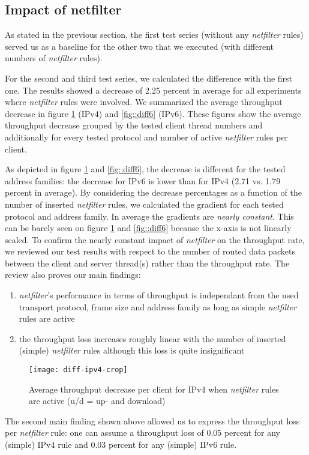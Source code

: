 \documentclass{sig-alternate}
\begin{document}
\subsection{Impact of netfilter}
\noindent As stated in the previous section, the first test series (without any 
\emph{netfilter} rules) served us as a baseline for the other two that we 
executed (with different numbers of \emph{netfilter} rules).

\newpage
\noindent For the second and third test series, we calculated the difference 
with the first one. The results showed a decrease of 2.25 percent in average for 
all experiments where \emph{netfilter} rules were involved. We summarized the
average throughput decrease in figure \ref{fig::diff4} (IPv4) and 
\ref{fig::diff6} (IPv6). These figures show the average throughput decrease 
grouped by the tested client thread numbers and additionally for every tested 
protocol and number of active \emph{netfilter} rules per client.

As depicted in figure \ref{fig::diff4} and \ref{fig::diff6}, the decrease is 
different for the tested address families: the decrease for IPv6 is lower than 
for IPv4 (2.71 vs. 1.79 percent in average). By considering the decrease 
percentages as a function of the number of inserted \emph{netfilter} rules, we 
calculated the gradient for each tested protocol and address family. In average 
the gradients are \emph{nearly constant}. This can be barely seen on figure 
\ref{fig::diff4} and \ref{fig::diff6} because the x-axis is not linearly 
scaled. To confirm the nearly constant impact of \emph{netfilter} on the 
throughput rate, we reviewed our test results with respect to the number of 
routed data packets between the client and server thread(s) rather than the 
throughput rate. The review also proves our main findings:
\begin{enumerate}
\item \emph{netfilter}'s performance in terms of throughput is independant from 
the used transport protocol, fra\-me size and address family as long as simple 
\emph{netfilter} rules are active
\item the throughput loss increases roughly linear with the number of inserted 
(simple) \emph{netfilter} rules although this loss is quite insignificant
\end{enumerate}
\begin{figure}[!t]
\texttt{[image: diff-ipv4-crop]}
\caption{Average throughput decrease per client for IPv4 when \emph{netfilter} 
rules are active (u/d = up- and download)}
\label{fig::diff4}
\end{figure}
The second main finding shown above allowed us to express the throughput loss 
per \emph{netfilter} rule: one can assume a throughput loss of 0.05 percent for 
any (simple) IPv4 rule and 0.03 percent for any (simple) IPv6 rule.
\end{document}
